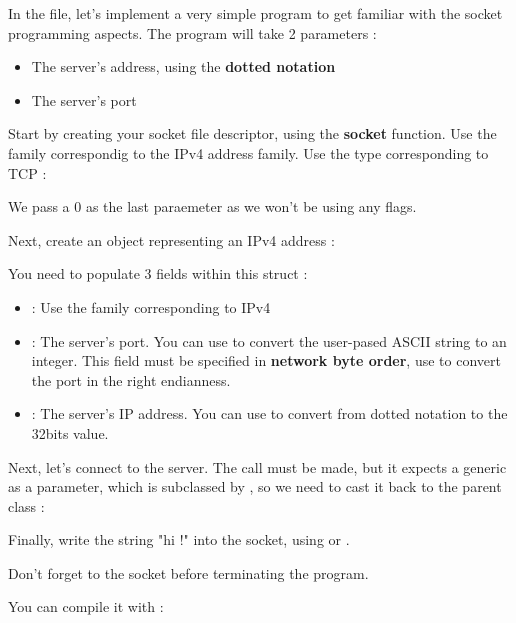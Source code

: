 In the  file, let's implement a very simple program to get familiar with the socket programming aspects.
The program will take 2 parameters :
\begin{itemize}
	\item The server's address, using the \textbf{dotted notation}
	\item The server's port
\end{itemize}

Start by creating your socket file descriptor, using the \textbf{socket} function. Use the  family correspondig to the IPv4 address family. Use the  type corresponding to TCP :


We pass a 0 as the last paraemeter as we won't be using any flags.

Next, create an object representing an IPv4 address :

You need to populate 3 fields within this struct :
\begin{itemize}
	\item {} : Use the  family corresponding to IPv4
	\item {} : The server's port. You can use  to convert the user-pased ASCII string to an integer. This field must be specified in \textbf{network byte order}, use  to convert the port in the right endianness.
	\item {} : The server's IP address. You can use  to convert from dotted notation to the 32bits value.
\end{itemize}

Next, let's connect to the server. The  call must be made, but it expects a generic  as a parameter, which is subclassed by , so we need to cast it back to the parent class :


Finally, write the string "hi !" into the socket, using  or .

Don't forget to  the socket before terminating the program.

You can compile it with :


